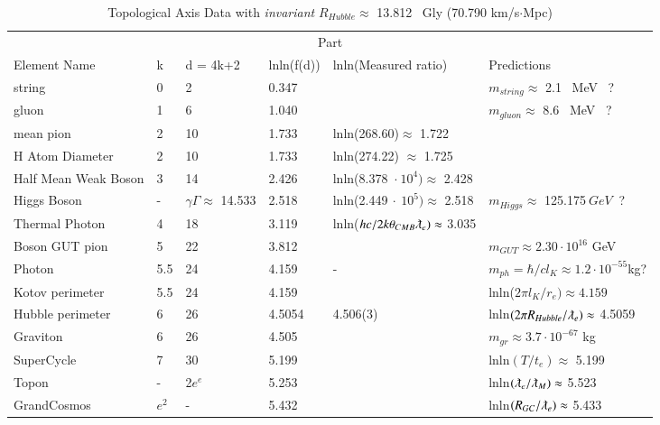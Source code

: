 \documentclass[twoside,draft]{article}
\begin{document}
\begin{sloppypar}
\begin{table}
 \caption{Topological Axis Data with \textit{invariant} $R_{Hubble}  \approx$ 13.812 ~Gly (70.790 km/s$\cdot$Mpc) }
  \centering
  \begin{tabular}{llllll}
    \toprule
    \multicolumn{6}{c}{Part}                   \\
    \cmidrule(r){1-6}
   Element Name     & k     & d = 4k+2 & lnln(f(d)) & lnln(Measured ratio)\cite{Tanabashi} & Predictions \\
    \midrule
    string & 0  & 2 & 0.347 &  & $ m_{string} \approx$ 2.1~ MeV ~? \\
    gluon  & 1 & 6 & 1.040 &  & $m_{gluon} \approx$ 8.6~ MeV ~? \\  
    mean pion & 2  & 10 & 1.733 & lnln(268.60)$\approx$ 1.722 &  \\ 
    H Atom Diameter & 2  & 10 & 1.733 & lnln(274.22) $\approx$ 1.725  &  \\
    Half Mean Weak Boson & 3  & 14 & 2.426 & lnln(8.378~$\cdot~10^4)\approx$ 2.428  &   \\
    Higgs Boson & - & $\gamma\Gamma \approx$ 14.533 & 2.518 &lnln(2.449$~\cdot~10^5)\approx$ 2.518& $m_{Higgs} \approx$ 125.175$~ GeV ~$ ? \\ 
    Thermal Photon & 4  & 18 & 3.119 & lnln($hc/2k\theta_{CMB}\lambdabar_e) \approx$ 3.035 &  \\
    Boson GUT pion & 5  & 22 & 3.812 & & $m_{GUT} \approx 2.30\cdot 10^{16}$ GeV \\
    Photon & 5.5  & 24 & 4.159 & - & $m_{ph} = \hbar/cl_K \approx 1.2\cdot 10^{-55}$kg? \\
    Kotov perimeter & 5.5  & 24 & 4.159 & & lnln($2\pi l_K /r_e)\approx 4.159$ \\
    Hubble perimeter & 6  & 26 & 4.5054 & 4.506(3)\cite{Bonvin} & lnln$(2\pi R_{Hubble} /\lambdabar_e)\approx$ 4.5059  \\
    Graviton & 6  & 26 & 4.505 &  & $ m_{gr} \approx 3.7\cdot 10^{-67}$ kg  \\
    SuperCycle & 7  & 30 & 5.199 & & lnln$(T/t_e) \approx$ 5.199 \\
    Topon & - & 2$e^e$ & 5.253 &  & lnln$(\lambdabar_e/\lambdabar_M) \approx$ 5.523 \\
    GrandCosmos & $e^2$  & - & 5.432 & & lnln$(R_{GC}/\lambdabar_e)\approx$ 5.433  \\
    \bottomrule
  \end{tabular}
  \label{tab:table}
\end{table}










\end{sloppypar}
\end{document}
